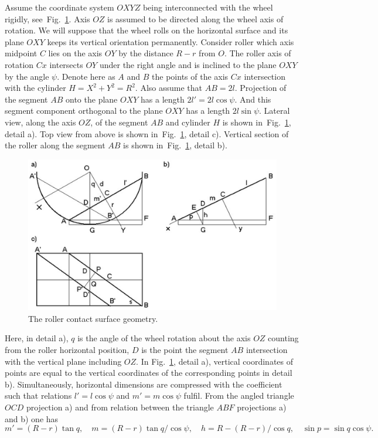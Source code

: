 \documentclass{jsme-tj}
\begin{document}
Assume the coordinate system $OXYZ$ being interconnected with the wheel 
rigidly, see~Fig.~\ref{Fig3}. Axis $OZ$ is assumed to be directed along the 
wheel axis of rotation. We will suppose that the wheel rolls on the horizontal 
surface and its plane $OXY$ keeps its vertical orientation permanently. 
Consider roller which axis midpoint $C$ lies on the axis $OY$ by the distance 
$R-r$ from $O$. The roller axis of rotation $Cx$ intersects $OY$ under the 
right angle and is inclined to the plane $OXY$ by the angle $\psi $. Denote 
here as $A$ and $B$ the points of the axis $Cx$ intersection with the cylinder 
$H={X^2+Y^2=R^2}$. Also assume that $AB=2l$. Projection of the segment $AB$ 
onto the plane $OXY$ has a length $2l'=2l\cos\psi $. And this segment component 
orthogonal to the plane $OXY$ has a length $2l\sin\psi $. Lateral view, along 
the axis $OZ$, of the segment $AB$ and cylinder $H$ is shown 
in~Fig.~\ref{Fig3}, detail a). Top view from above is shown in~Fig.~\ref{Fig3}, 
detail c). Vertical section of the roller along the segment $AB$ is shown 
in~Fig.~\ref{Fig3}, detail b).

\begin{figure}[h]
\centerline{\includegraphics[bb = 0 0 19.50cm 12cm,scale=0.7]{RollerGeometry.png}}
\caption{The roller contact surface geometry.}
\label{Fig3}
\end{figure}

Here, in detail a), $q$ is the angle of the wheel rotation about the axis $OZ$
counting from the roller horizontal position, $D$ is the point the segment $AB$
intersection with the vertical plane including $OZ$. In Fig.~\ref{Fig3}, detail 
a), vertical coordinates of points are equal to the vertical coordinates of the 
corresponding points in detail b). Simultaneously, horizontal dimensions are 
compressed with the coefficient such that relations $l'=l\cos\psi $ and 
$m'=m\cos\psi $ fulfil. From the angled triangle $OCD$ projection a) and from 
relation between the triangle $ABF$ projections a) and b) one has
\begin{equation}
m'=(R-r)\tan q,\quad m=(R-r)\tan q/\cos\psi ,\quad h=R-(R-r)/\cos q,\quad
\sin p=\sin q\cos\psi .
\label{aux}
\end{equation}
\end{document}
